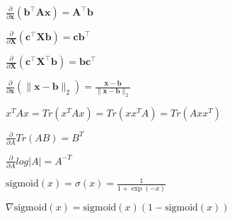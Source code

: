\begin{inparaitem}[\color{red}\textbullet]
	\item $\frac{\partial}{\partial \mathbf{x}}(\mathbf{b}^\top \mathbf{A}\mathbf{x}) = \mathbf{A}^\top \mathbf{b}$
	\item $\frac{\partial}{\partial \mathbf{X}}(\mathbf{c}^\top \mathbf{X} \mathbf{b}) = \mathbf{c}\mathbf{b}^\top$ \\
	\item $\frac{\partial}{\partial \mathbf{X}}(\mathbf{c}^\top \mathbf{X}^\top \mathbf{b}) = \mathbf{b}\mathbf{c}^\top$
	\item $\frac{\partial}{\partial \mathbf{x}}(\| \mathbf{x}-\mathbf{b} \|_2) = \frac{\mathbf{x}-\mathbf{b}}{\|\mathbf{x}-\mathbf{b}\|_2}$ \\
	\item $x^T A x = Tr(x^T A x) = Tr(x x^T A) = Tr(A x x^T)$ \\
	\item $\tfrac{\partial}{\partial A} Tr(AB) {=} B^T$
	\item $\frac{\partial}{\partial A} log|A| {=} A^{-T}$ \\
	\item $\text{sigmoid}(x) = \sigma(x) = \frac{1}{1+\exp(-x)}$ \\
	\item $\nabla \text{sigmoid}(x) = \text{sigmoid}(x)(1-\text{sigmoid}(x))$
\end{inparaitem}
